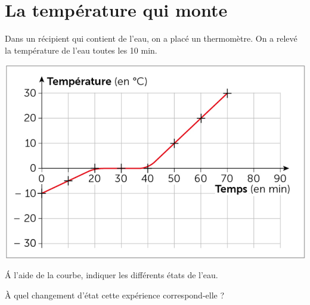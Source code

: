 \section{La température qui monte}\label{ex:fusion}

Dans un récipient qui contient de l'eau, on a placé un thermomètre. On a relevé la température de l'eau toutes les 10 min.

\begin{center}
	\includegraphics[scale=0.4]{./img/courbe}
\end{center}

\begin{questions}
	\question[2] \'A l'aide de la courbe, indiquer les différents états de l'eau.
	
	\question[1] \`A quel changement d'état cette expérience correspond-elle ? 
\end{questions}